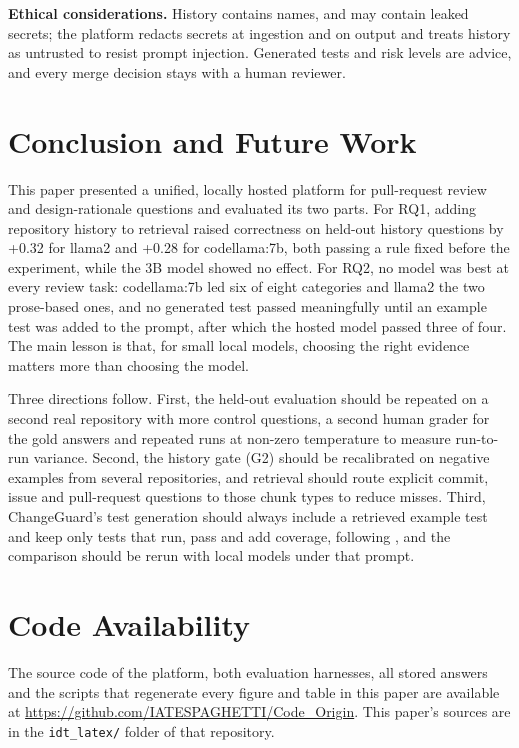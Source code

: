\documentclass[12pt,onecolumn,draftclsnofoot]{IEEEtran}
\begin{document}
\textbf{Ethical considerations.} History contains names, and may contain leaked secrets; the platform redacts secrets at ingestion and on output and treats history as untrusted to resist prompt injection. Generated tests and risk levels are advice, and every merge decision stays with a human reviewer.

\section{Conclusion and Future Work}

This paper presented a unified, locally hosted platform for pull-request review and design-rationale questions and evaluated its two parts. For RQ1, adding repository history to retrieval raised correctness on held-out history questions by +0.32 for llama2 and +0.28 for codellama:7b, both passing a rule fixed before the experiment, while the 3B model showed no effect. For RQ2, no model was best at every review task: codellama:7b led six of eight categories and llama2 the two prose-based ones, and no generated test passed meaningfully until an example test was added to the prompt, after which the hosted model passed three of four. The main lesson is that, for small local models, choosing the right evidence matters more than choosing the model.

Three directions follow. First, the held-out evaluation should be repeated on a second real repository with more control questions, a second human grader for the gold answers and repeated runs at non-zero temperature to measure run-to-run variance. Second, the history gate (G2) should be recalibrated on negative examples from several repositories, and retrieval should route explicit commit, issue and pull-request questions to those chunk types to reduce misses. Third, ChangeGuard's test generation should always include a retrieved example test and keep only tests that run, pass and add coverage, following \cite{alshahwan2024testgen}, and the comparison should be rerun with local models under that prompt.

\section*{Code Availability}
The source code of the platform, both evaluation harnesses, all stored answers and the scripts that regenerate every figure and table in this paper are available at \url{https://github.com/IATESPAGHETTI/Code_Origin}. This paper's sources are in the \texttt{idt\_latex/} folder of that repository.
\end{document}
